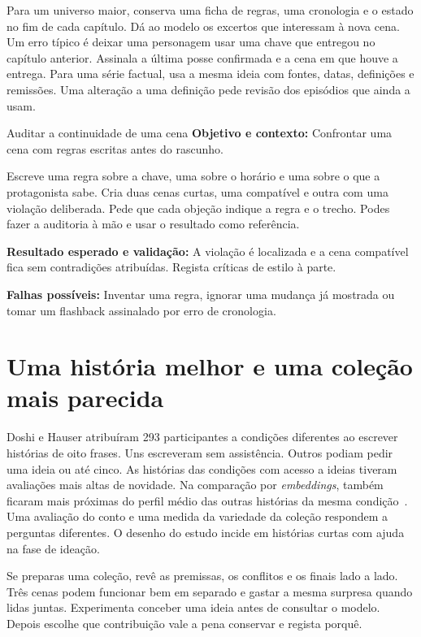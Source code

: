 Para um universo maior, conserva uma ficha de regras, uma cronologia e o estado no fim de cada capítulo. Dá ao modelo os excertos que interessam à nova cena. Um erro típico é deixar uma personagem usar uma chave que entregou no capítulo anterior. Assinala a última posse confirmada e a cena em que houve a entrega. Para uma série factual, usa a mesma ideia com fontes, datas, definições e remissões. Uma alteração a uma definição pede revisão dos episódios que ainda a usam.

\begin{promptlabbox}{Auditar a continuidade de uma cena}
\textbf{Objetivo e contexto:} Confrontar uma cena com regras escritas antes do rascunho.

Escreve uma regra sobre a chave, uma sobre o horário e uma sobre o que a protagonista sabe. Cria duas cenas curtas, uma compatível e outra com uma violação deliberada. Pede que cada objeção indique a regra e o trecho. Podes fazer a auditoria à mão e usar o resultado como referência.

\textbf{Resultado esperado e validação:} A violação é localizada e a cena compatível fica sem contradições atribuídas. Regista críticas de estilo à parte.

\textbf{Falhas possíveis:} Inventar uma regra, ignorar uma mudança já mostrada ou tomar um flashback assinalado por erro de cronologia.
\end{promptlabbox}

\section{Uma história melhor e uma coleção mais parecida}

Doshi e Hauser atribuíram 293 participantes a condições diferentes ao escrever histórias de oito frases. Uns escreveram sem assistência. Outros podiam pedir uma ideia ou até cinco. As histórias das condições com acesso a ideias tiveram avaliações mais altas de novidade. Na comparação por \emph{embeddings}, também ficaram mais próximas do perfil médio das outras histórias da mesma condição~\citep{doshi2024}. Uma avaliação do conto e uma medida da variedade da coleção respondem a perguntas diferentes. O desenho do estudo incide em histórias curtas com ajuda na fase de ideação.

Se preparas uma coleção, revê as premissas, os conflitos e os finais lado a lado. Três cenas podem funcionar bem em separado e gastar a mesma surpresa quando lidas juntas. Experimenta conceber uma ideia antes de consultar o modelo. Depois escolhe que contribuição vale a pena conservar e regista porquê.
